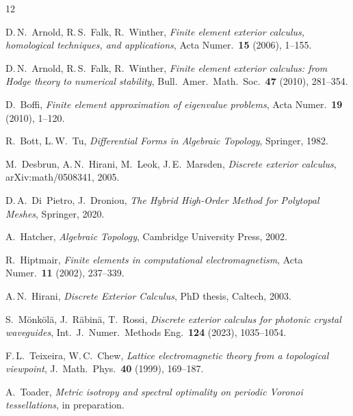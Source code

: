 \documentclass[11pt]{article}
\theoremstyle{remark}
\begin{document}
\begin{thebibliography}{12}

D.\,N.~Arnold, R.\,S.~Falk, R.~Winther,
\emph{Finite element exterior calculus, homological techniques, and
applications},
Acta Numer.\ \textbf{15} (2006), 1--155.

D.\,N.~Arnold, R.\,S.~Falk, R.~Winther,
\emph{Finite element exterior calculus: from Hodge theory to numerical
stability},
Bull.\ Amer.\ Math.\ Soc.\ \textbf{47} (2010), 281--354.

D.~Boffi,
\emph{Finite element approximation of eigenvalue problems},
Acta Numer.\ \textbf{19} (2010), 1--120.

R.~Bott, L.\,W.~Tu,
\emph{Differential Forms in Algebraic Topology},
Springer, 1982.

M.~Desbrun, A.\,N.~Hirani, M.~Leok, J.\,E.~Marsden,
\emph{Discrete exterior calculus},
arXiv:math/0508341, 2005.

D.\,A.~Di~Pietro, J.~Droniou,
\emph{The Hybrid High-Order Method for Polytopal Meshes},
Springer, 2020.

A.~Hatcher,
\emph{Algebraic Topology},
Cambridge University Press, 2002.

R.~Hiptmair,
\emph{Finite elements in computational electromagnetism},
Acta Numer.\ \textbf{11} (2002), 237--339.

A.\,N.~Hirani,
\emph{Discrete Exterior Calculus},
PhD thesis, Caltech, 2003.

S.~M\"onk\"ol\"a, J.~R\"abin\"a, T.~Rossi,
\emph{Discrete exterior calculus for photonic crystal waveguides},
Int.\ J.\ Numer.\ Methods Eng.\ \textbf{124} (2023), 1035--1054.

F.\,L.~Teixeira, W.\,C.~Chew,
\emph{Lattice electromagnetic theory from a topological viewpoint},
J.\ Math.\ Phys.\ \textbf{40} (1999), 169--187.

A.~Toader,
\emph{Metric isotropy and spectral optimality on periodic Voronoi
tessellations},
in preparation.

\end{thebibliography}
\end{document}
